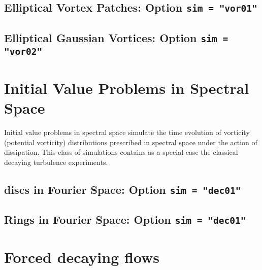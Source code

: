 \subsection{Elliptical Vortex Patches: Option {\tt sim = "vor01"}}

\subsection{Elliptical Gaussian Vortices: Option {\tt sim = "vor02"}}


\section{Initial Value Problems in Spectral Space}

Initial value problems in spectral space simulate the time evolution
of vorticity (potential vorticity) distributions prescribed in spectral
space under the action of dissipation. This class of simulations
contains as a special case the classical decaying turbulence
experiments.


\subsection{discs in Fourier Space: Option {\tt sim = "dec01"}}

\subsection{Rings in Fourier Space: Option {\tt sim = "dec01"}}


\section{Forced decaying flows}

